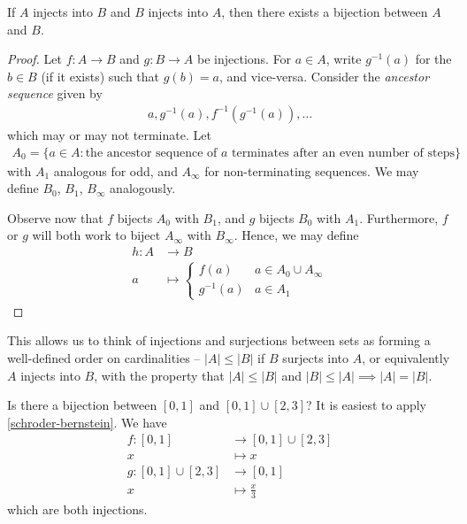 \documentclass{../template/note}
\begin{document}
    \begin{theorem}
        \label{schroder-bernstein}
        If \(A\) injects into \(B\) and \(B\) injects into \(A\), then there exists a bijection between \(A\) and \(B\).
    \end{theorem}
    
    \begin{proof}
        Let \(f: A \to B\) and \(g: B \to A\) be injections. For \(a \in A\), write \(g^{-1}(a)\) for the \(b \in B\) (if it exists) such that \(g(b) = a\), and vice-versa. Consider the \emph{ancestor sequence} given by
        \begin{align*}
            a, g^{-1}(a), f^{-1}(g^{-1}(a)), \dots
        \end{align*}
        which may or may not terminate. Let 
        \begin{align*}
            A_0 = \{a \in A: \text{the ancestor sequence of \(a\) terminates after an even number of steps}\}
        \end{align*}
        with \(A_1\) analogous for odd, and \(A_\infty\) for non-terminating sequences. We may define \(B_0\), \(B_1\), \(B_\infty\) analogously.

        Observe now that \(f\) bijects \(A_0\) with \(B_1\), and \(g\) bijects \(B_0\) with \(A_1\). Furthermore, \(f\) or \(g\) will both work to biject \(A_\infty\) with \(B_\infty\). Hence, we may define
        \begin{align*}
            h: A &\to B \\
            a &\mapsto \begin{cases}
                f(a) & a \in A_0 \cup A_\infty \\
                g^{-1}(a) & a \in A_1
            \end{cases}
        \end{align*}
    \end{proof}
    
    This allows us to think of injections and surjections between sets as forming a well-defined order on cardinalities -- \(|A| \leq |B|\) if \(B\) surjects into \(A\), or equivalently \(A\) injects into \(B\), with the property that \(|A| \leq |B|\) and \(|B| \leq |A| \implies |A| = |B|\).
    
    \begin{example*}
        Is there a bijection between \([0, 1]\) and \([0, 1] \cup [2, 3]\)? It is easiest to apply \cref{schroder-bernstein}. We have
        \begin{align*}
            f: [0, 1] &\to [0, 1] \cup [2, 3] \\
            x &\mapsto x \\[10pt]
            g: [0, 1] \cup [2, 3] &\to [0, 1] \\
            x &\mapsto \frac x 3 
        \end{align*}
        which are both injections.        
    \end{example*}
    
\end{document}
